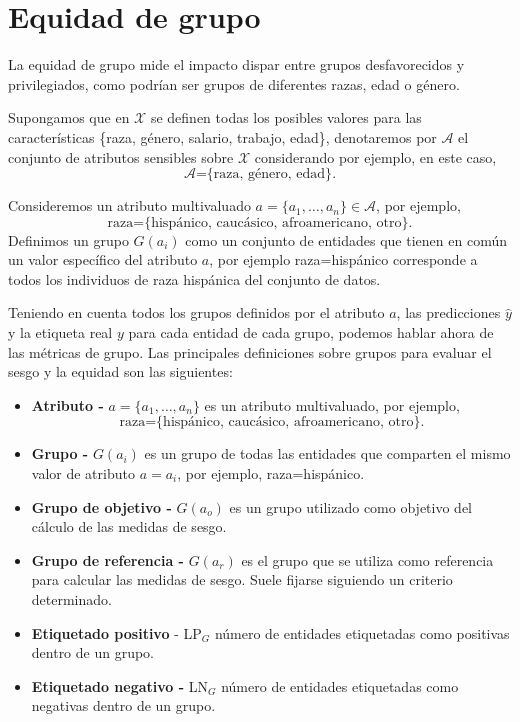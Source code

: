 \documentclass[oneside,openright,titlepage,numbers=noenddot,openany,headinclude,footinclude=true,
cleardoublepage=empty,abstractoff,BCOR=5mm,paper=a4,fontsize=12pt,main=spanish]{scrreprt}
\begin{document}
\section{Equidad de grupo}

La equidad de grupo mide el impacto dispar entre grupos desfavorecidos y privilegiados, como podrían ser grupos de diferentes razas, edad o género.

Supongamos que en $\mathcal{X}$ se definen todas los posibles valores para las características \{raza, género, salario, trabajo, edad\}, denotaremos por $\mathcal{A}$ el conjunto de atributos sensibles sobre $\mathcal{X}$ considerando por ejemplo, en este caso, $$\mathcal{A}\text{=\{raza, género, edad\}}.$$

Consideremos un atributo multivaluado $a = \{a_1,\dots,a_n\} \in \mathcal{A}$, por ejemplo, $$\text{raza=\{hispánico, caucásico, afroamericano, otro\}}.$$ Definimos un grupo $G(a_i)$
como un conjunto de entidades que tienen en común un valor específico
del atributo $a$, por ejemplo raza=hispánico corresponde a todos los individuos de raza hispánica del
conjunto de datos.

Teniendo en cuenta todos los grupos definidos por el atributo $a$, las predicciones $\hat{y}$ y la etiqueta real $y$ para cada entidad de cada grupo, podemos hablar
ahora de las métricas de grupo. Las principales definiciones sobre grupos para
evaluar el sesgo y la equidad son las siguientes:

\begin{itemize}
    \item \textbf{Atributo -} $a = \{a_1,\dots,a_n\}$ es un atributo multivaluado, por ejemplo, $$\text{raza=\{hispánico, caucásico, afroamericano, otro\}}.$$
    \item \textbf{Grupo -} $G(a_i)$ es un grupo de todas las entidades que comparten el mismo valor de atributo $a=a_i$, por ejemplo, raza=hispánico.
    \item \textbf{Grupo de objetivo -} $G(a_o)$ es un grupo utilizado como objetivo del cálculo de las medidas de sesgo.
    \item \textbf{Grupo de referencia -} $G(a_r)$ es el grupo que se utiliza como referencia para calcular las medidas de sesgo. Suele fijarse siguiendo un criterio determinado.
    \item \textbf{Etiquetado positivo} - LP$_G$ número de entidades etiquetadas como positivas dentro de un grupo.
    \item \textbf{Etiquetado negativo -} LN$_G$ número de entidades etiquetadas como negativas dentro de un grupo.
\end{itemize}
\end{document}
